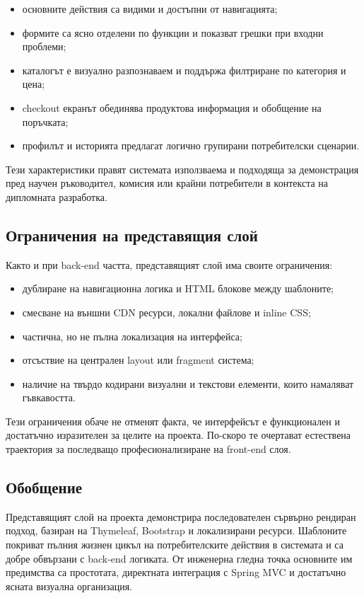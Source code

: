 \begin{itemize}[leftmargin=*]
    \item основните действия са видими и достъпни от навигацията;
    \item формите са ясно отделени по функции и показват грешки при входни проблеми;
    \item каталогът е визуално разпознаваем и поддържа филтриране по категория и цена;
    \item checkout екранът обединява продуктова информация и обобщение на поръчката;
    \item профилът и историята предлагат логично групирани потребителски сценарии.
\end{itemize}

Тези характеристики правят системата използваема и подходяща за демонстрация пред научен ръководител, комисия или крайни потребители в контекста на дипломната разработка.

\subsection{Ограничения на представящия слой}

Както и при back-end частта, представящият слой има своите ограничения:

\begin{itemize}[leftmargin=*]
    \item дублиране на навигационна логика и HTML блокове между шаблоните;
    \item смесване на външни CDN ресурси, локални файлове и inline CSS;
    \item частична, но не пълна локализация на интерфейса;
    \item отсъствие на централен layout или fragment система;
    \item наличие на твърдо кодирани визуални и текстови елементи, които намаляват гъвкавостта.
\end{itemize}

Тези ограничения обаче не отменят факта, че интерфейсът е функционален и достатъчно изразителен за целите на проекта. По-скоро те очертават естествена траектория за последващо професионализиране на front-end слоя.

\subsection{Обобщение}

Представящият слой на проекта демонстрира последователен сървърно рендиран подход, базиран на Thymeleaf, Bootstrap и локализирани ресурси. Шаблоните покриват пълния жизнен цикъл на потребителските действия в системата и са добре обвързани с back-end логиката. От инженерна гледна точка основните им предимства са простотата, директната интеграция с Spring MVC и достатъчно ясната визуална организация.

